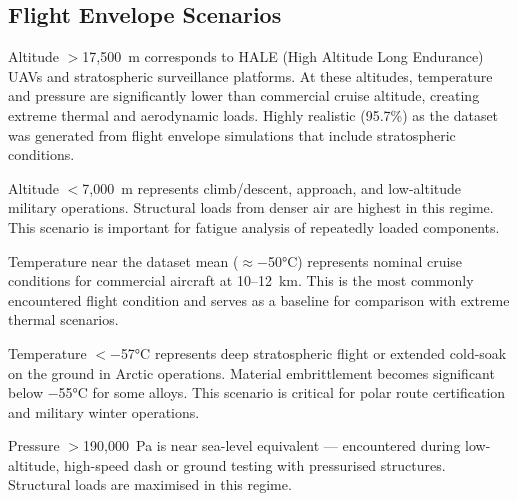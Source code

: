 \documentclass[12pt,a4paper]{article}
\begin{document}
\subsection{Flight Envelope Scenarios}

\begin{tcolorbox}[rulebox, title={Altitude Extreme High (Realism 95.7\%)}]
Altitude $>$17{,}500~m corresponds to HALE (High Altitude Long Endurance) UAVs and stratospheric surveillance platforms. At these altitudes, temperature and pressure are significantly lower than commercial cruise altitude, creating extreme thermal and aerodynamic loads. Highly realistic (95.7\%) as the dataset was generated from flight envelope simulations that include stratospheric conditions.
\end{tcolorbox}

\begin{tcolorbox}[rulebox, title={Altitude Extreme Low (Realism 93.9\%)}]
Altitude $<$7{,}000~m represents climb/descent, approach, and low-altitude military operations. Structural loads from denser air are highest in this regime. This scenario is important for fatigue analysis of repeatedly loaded components.
\end{tcolorbox}

\begin{tcolorbox}[rulebox, title={Temperature Moderate (Realism 96.9\%)}]
Temperature near the dataset mean ($\approx$$-$50°C) represents nominal cruise conditions for commercial aircraft at 10--12~km. This is the most commonly encountered flight condition and serves as a baseline for comparison with extreme thermal scenarios.
\end{tcolorbox}

\begin{tcolorbox}[rulebox, title={Temperature Extreme Cold (Realism 84.9\%)}]
Temperature $<$$-$57°C represents deep stratospheric flight or extended cold-soak on the ground in Arctic operations. Material embrittlement becomes significant below $-$55°C for some alloys. This scenario is critical for polar route certification and military winter operations.
\end{tcolorbox}

\begin{tcolorbox}[rulebox, title={Pressure Extreme High (Realism 91.5\%)}]
Pressure $>$190{,}000~Pa is near sea-level equivalent --- encountered during low-altitude, high-speed dash or ground testing with pressurised structures. Structural loads are maximised in this regime.
\end{tcolorbox}
\end{document}

